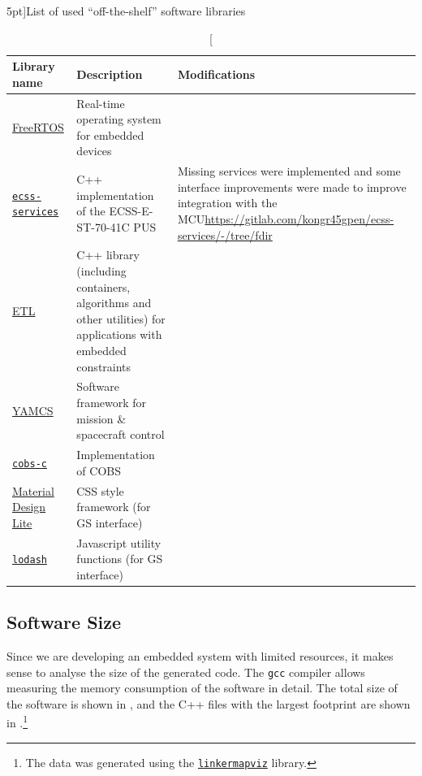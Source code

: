\documentclass[a4paper,nobib]{tufte-book}
\begin{document}
\begin{table}[h]
	\centering
	\caption[][5pt]{List of used ``off-the-shelf'' software libraries}
	\renewcommand{\arraystretch}{1.5}
	\label{tab:old_software}
	\vspace{1.3cm}
	\begin{tabularx}{\textwidth}{@{}lp{6cm}X@{}}
		\toprule
		Library name & Description & Modifications \\ \midrule
		\href{https://www.freertos.org/}{FreeRTOS} & Real-time operating system for embedded devices & \\
		\href{https://gitlab.com/acubesat/obc/ecss-services}{\texttt{ecss-services}} & C++ implementation of the ECSS-E-ST-70-41C \acl{PUS} %
		& \small Missing services were implemented and some interface improvements were made to improve integration with the \acs{MCU}\newline\small\url{https://gitlab.com/kongr45gpen/ecss-services/-/tree/fdir}
		 \\
		 \href{https://www.etlcpp.com/}{\acs{ETL}}  & C++ library (including containers, algorithms and other utilities) for applications with embedded constraints &
		 \\
 		\href{https://github.com/yamcs/yamcs}{\acs{YAMCS}}  & Software framework for mission \& spacecraft control & %
 		\\
		\href{https://github.com/cmcqueen/cobs-c}{\texttt{cobs-c}}  & Implementation of \ac{COBS} %
		 & \\
		 \href{https://getmdl.io/}{Material Design Lite} & CSS style framework (for \acs{GS} interface) & \\
		 \href{https://lodash.com/}{\texttt{lodash}} & Javascript utility functions (for \acs{GS} interface) & \\
		\bottomrule
	\end{tabularx}
\end{table}


\FloatBarrier
\subsection{Software Size}

Since we are developing an embedded system with limited resources, it makes sense to analyse the size of the generated code. The \texttt{gcc} compiler allows measuring the memory consumption of the software in detail. The total size of the software is shown in , and the C++ files with the largest footprint are shown in .\footnote{The data was generated using the \href{https://github.com/PromyLOPh/linkermapviz}{\texttt{linkermapviz}} library.}
\end{document}
